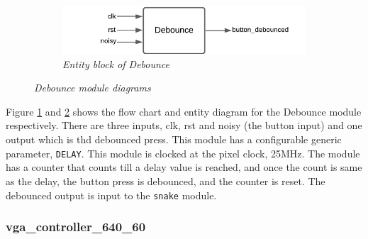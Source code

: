 \documentclass[aps, secnumarabic, balancelastpage, asmath, amssymb, nofootinbib, floatfix,]{revtex4-2}
\begin{document}
{\begin{figure}[h]
\begin{subfigure}{0.5\textwidth}
\label{fig:subim3}
\end{subfigure}
\begin{subfigure}{0.4\textwidth}
  \includegraphics[scale = 0.72]{debounce.pdf}
  \caption{\em Entity block of Debounce}
  
\label{fig:subim4}
\end{subfigure}
\caption{\em Debounce module diagrams}
\label{fig:12}
\end{figure}

Figure \ref{fig:subim3} and \ref{fig:subim4} shows the flow chart and entity diagram for the Debounce module respectively. There are three inputs, clk, rst and noisy (the button input) and one output which is thd debounced press. This module has a configurable generic parameter, \verb|DELAY|. This module is clocked at the pixel clock, 25MHz. The module has a counter that counts till a delay value is reached, and once the count is same as the delay, the button press is debounced, and the counter is reset. The debounced output is input to the \verb|snake| module.

\clearpage

\subsubsection{\fontsize{10pt}{12pt}\selectfont \bf vga\_controller\_640\_60 \label{sec:2.2.6}}


}
\end{document}
